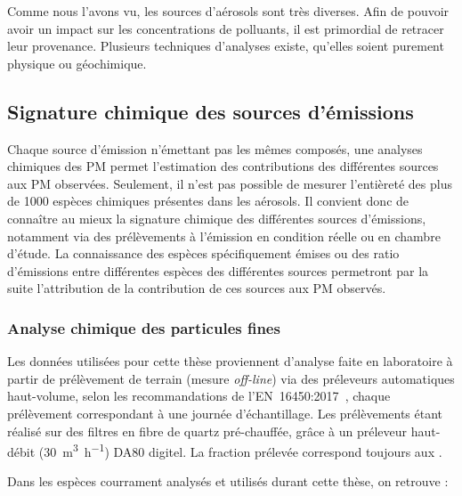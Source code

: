 Comme nous l'avons vu, les sources d'aérosols sont très diverses.
Afin de pouvoir avoir un impact sur les concentrations de polluants, il est primordial de
retracer leur provenance. Plusieurs techniques d'analyses existe, qu'elles soient purement
physique ou géochimique.

\subsection{Signature chimique des sources d'émissions}%
\label{sec:signature_chimique_des_sources_demissions}

Chaque source d'émission n'émettant pas les mêmes composés, une analyses chimiques
des PM permet l'estimation des contributions des différentes sources aux PM observées.
Seulement, il n'est pas possible de mesurer l'entièreté des plus de 1000 espèces chimiques présentes
dans les aérosols.
Il convient donc de connaître au mieux la signature chimique des différentes sources
d'émissions, notamment via des prélèvements à l'émission en condition
réelle ou en chambre d'étude. La connaissance des espèces spécifiquement émises ou des
ratio d'émissions entre différentes espèces des différentes sources permetront par la
suite l'attribution de la contribution de ces sources aux PM observés.

\subsubsection{Analyse chimique des particules fines}%
\label{ssub:analyse_chimique_des_particules_fines}

Les données utilisées pour cette thèse proviennent d'analyse faite en laboratoire à
partir de prélèvement de terrain (mesure \textit{off-line}) via des préleveurs
automatiques haut-volume, selon les recommandations de
l'EN~16450:2017~\autocite{cenAmbient2017a}, chaque prélèvement correspondant à une
journée d'échantillage. Les prélèvements étant réalisé sur des filtres en fibre de quartz
pré-chauffée, grâce à un préleveur haut-débit (\SI{30}{\cubic\m\per\hour}) DA80 digitel.
La fraction prélevée correspond toujours aux \PMdix{}.

Dans les espèces courrament analysés et utilisés durant cette thèse, on retrouve :


